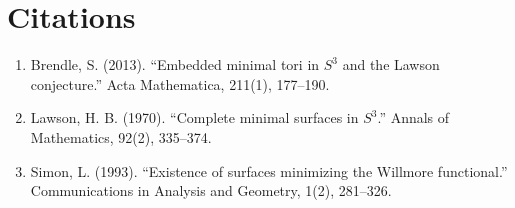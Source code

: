 \section{Citations}

\begin{enumerate}
\item Brendle, S. (2013). ``Embedded minimal tori in $S^3$ and the Lawson conjecture.'' Acta Mathematica, 211(1), 177--190.
\item Lawson, H. B. (1970). ``Complete minimal surfaces in $S^3$.'' Annals of Mathematics, 92(2), 335--374.
\item Simon, L. (1993). ``Existence of surfaces minimizing the Willmore functional.'' Communications in Analysis and Geometry, 1(2), 281--326.
\end{enumerate}
